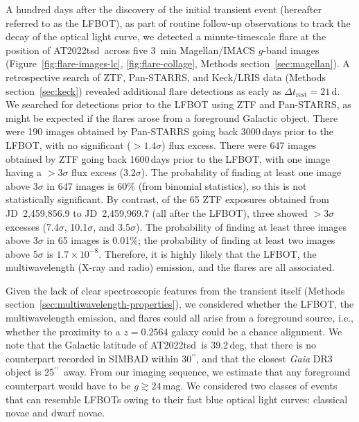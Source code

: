 \documentclass{nature_plusfigure}
\newcommand{\at}{AT2022tsd}
\newcommand{\arcsec}{$^{\prime\prime}$}
\begin{document}
\begin{methods}
A hundred days after the discovery of the initial transient event (hereafter referred to as the LFBOT), as part of routine follow-up observations to track the decay of the optical light curve, we detected\cite{Ho2022_Astronote_Flares} a minute-timescale flare at the position of \at\ across five 3~min Magellan/IMACS $g$-band images (Figure~\ref{fig:flare-images-lc}, \ref{fig:flare-collage}, Methods section~\ref{sec:magellan}). A retrospective search of ZTF, Pan-STARRS, and Keck/LRIS data (Methods section~\ref{sec:keck}) revealed additional flare detections as early as $\Delta t_\mathrm{rest}=21\,$d. We searched for detections prior to the LFBOT using ZTF and Pan-STARRS, as might be expected if the flares arose from a foreground Galactic object. There were 190 images obtained by Pan-STARRS going back 3000\,days prior to the LFBOT, with no significant ($>1.4\sigma$) flux excess\cite{Fulton2022}. There were 647 images obtained by ZTF going back 1600\,days prior to the LFBOT, with one image having a $>3\sigma$ flux excess (3.2$\sigma$). The probability of finding at least one image above 3$\sigma$ in 647 images is 60\% (from binomial statistics), so this is not statistically significant. By contrast, of the 65 ZTF exposures obtained from JD~2,459,856.9 to JD~2,459,969.7 (all after the LFBOT), three showed $>3\sigma$ excesses (7.4$\sigma$, 10.1$\sigma$, and 3.5$\sigma$). The probability of finding at least three images above 3$\sigma$ in 65 images is 0.01\%; the probability of finding at least two images above 5$\sigma$ is $1.7\times10^{-8}$. Therefore, it is highly likely that the LFBOT, the multiwavelength (X-ray and radio) emission, and the flares are all associated. 


Given the lack of clear spectroscopic features from the transient itself (Methods section~\ref{sec:multiwavelength-properties}), we considered whether the LFBOT, the multiwavelength emission, and flares could all arise from a foreground source, i.e., whether the proximity to a $z=0.2564$ galaxy could be a chance alignment. 
We note that the Galactic latitude of \at\ is 39.2\,deg, that there is no counterpart recorded in SIMBAD within 30\arcsec, and that the closest {\it Gaia} DR3 object is 25\arcsec\ away. From our imaging sequence, we estimate that any foreground counterpart would have to be $g \gtrsim 24\,$mag. We considered two classes of events that can resemble LFBOTs owing to their fast blue optical light curves: classical novae and dwarf novae.


\end{methods}
\end{document}
